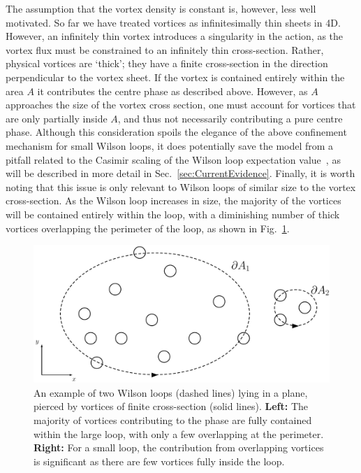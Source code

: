 The assumption that the vortex density is constant is, however, less well motivated. So far we have treated vortices as infinitesimally thin sheets in 4D. However, an infinitely thin vortex introduces a singularity in the action, as the vortex flux must be constrained to an infinitely thin cross-section. Rather, physical vortices are `thick'; they have a finite cross-section in the direction perpendicular to the vortex sheet. If the vortex is contained entirely within the area $A$ it contributes the centre phase as described above. However, as $A$ approaches the size of the vortex cross section, one must account for vortices that are only partially inside $A$, and thus not necessarily contributing a pure centre phase. Although this consideration spoils the elegance of the above confinement mechanism for small Wilson loops, it does potentially save the model from a pitfall related to the Casimir scaling of the Wilson loop expectation value~\cite{Greensite:1982be,Faber:1997rp}, as will be described in more detail in Sec.~\ref{sec:CurrentEvidence}. Finally, it is worth noting that this issue is only relevant to Wilson loops of similar size to the vortex cross-section. As the Wilson loop increases in size, the majority of the vortices will be contained entirely within the loop, with a diminishing number of thick vortices overlapping the perimeter of the loop, as shown in Fig.~\ref{fig:VortexSizes}.\\
%
\begin{figure}[htb!]
\centering
\includegraphics[width=\linewidth]{./LargeVortex.pdf}
\caption[An example of two Wilson loops lying in a plane, pierced by vortices of finite cross-section.]{\label{fig:VortexSizes}An example of two Wilson loops (dashed lines) lying in a plane, pierced by vortices of finite cross-section (solid lines). \textbf{Left:} The majority of vortices contributing to the phase are fully contained within the large loop, with only a few overlapping at the perimeter. \textbf{Right:} For a small loop, the contribution from overlapping vortices is significant as there are few vortices fully inside the loop.}
\end{figure}

